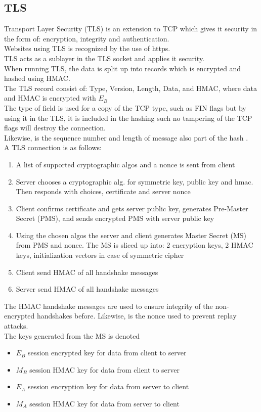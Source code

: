 \documentclass[12pt, a4paper]{article}
\begin{document}
		\subsection{TLS}
			Transport Layer Security (TLS) is an extension to TCP which gives it security in the form of: encryption, integrity and authentication.\\
			Websites using TLS is recognized by the use of https.\\
			TLS acts as a sublayer in the TLS socket and applies it security.\\
			When running TLS, the data is split up into records which is encrypted and hashed using HMAC.\\
			The TLS record consist of: Type, Version, Length, Data, and HMAC, where data and HMAC is encrypted with $E_B$\\
			The type of field is used for a copy of the TCP type, such as FIN flags but by using it in the TLS, it is included in the hashing such no tampering of the TCP flags will destroy the connection.\\
			Likewise, is the sequence number and length of message also part of the hash .\\
			A TLS connection is as follows:
			\begin{enumerate}
				\item A list of supported cryptographic algos and a nonce is sent from client
				\item Server chooses a cryptographic alg. for symmetric key, public key and hmac. Then responds with choices, certificate and server nonce
				\item Client confirms certificate and gets server public key, generates Pre-Master Secret (PMS), and sends encrypted PMS with server public key
				\item Using the chosen algos the server and client generates Master Secret (MS) from PMS and nonce. The MS is sliced up into: 2 encryption keys, 2 HMAC keys, initialization vectors in case of symmetric cipher
				\item Client send HMAC of all handshake messages
				\item Server send HMAC of all handshake messages
			\end{enumerate}
			The HMAC handshake messages are used to ensure integrity of the non-encrypted handshakes before. Likewise, is the nonce used to prevent replay attacks. \\
			The keys generated from the MS is denoted
			\begin{itemize}
				\item $E_B$ session encrypted key for data from client to server
				\item $M_B$ session HMAC key for data from client to server
				\item $E_A$ session encryption key for data from server to client
				\item $M_A$ session HMAC key for data from server to client
			\end{itemize}
\end{document}
